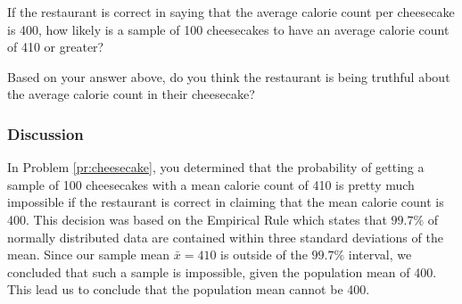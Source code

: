 \documentclass{ximera}
\begin{document}
\begin{problem}
\begin{question}
If the restaurant is correct in saying that the average calorie count per cheesecake is 400, how likely is a sample of 100 cheesecakes to have an average calorie count of 410 or greater?
\begin{multipleChoice}
\end{multipleChoice}
\end{question}
\begin{question}
Based on your answer above, do you think the restaurant is being truthful about the average calorie count in their cheesecake?
\begin{multipleChoice}
\end{multipleChoice}
\end{question}

\end{problem}

\subsubsection{Discussion}  In Problem \ref{pr:cheesecake}, you determined that the probability of getting a sample of 100 cheesecakes with a mean calorie count of 410 is pretty much impossible if the restaurant is correct in claiming that the mean calorie count is 400.  This decision was based on the Empirical Rule which states that $99.7\%$ of normally distributed data are contained within three standard deviations of the mean.  Since our sample mean $\bar{x}=410$ is outside of the $99.7\%$ interval, we concluded that such a sample is impossible, given the population mean of 400.  This lead us to conclude that the population mean cannot be 400. 
\end{document}
